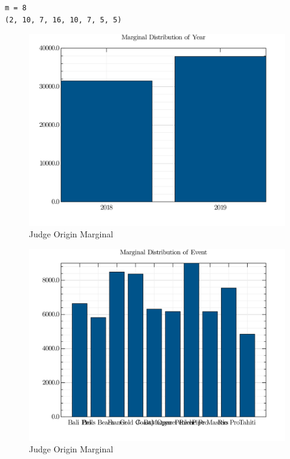 \documentclass[12pt,a4paper]{article}
\begin{document}
\begin{lstlisting}
m = 8
(2, 10, 7, 16, 10, 7, 5, 5)
\end{lstlisting}


\begin{figure}
\centering
\includegraphics{visuals/marginals_YR.png}
\caption{Judge Origin Marginal}
\end{figure}
 \begin{figure}
\centering
\includegraphics{visuals/marginals_EVT.png}
\caption{Judge Origin Marginal}
\end{figure}
\end{document}

